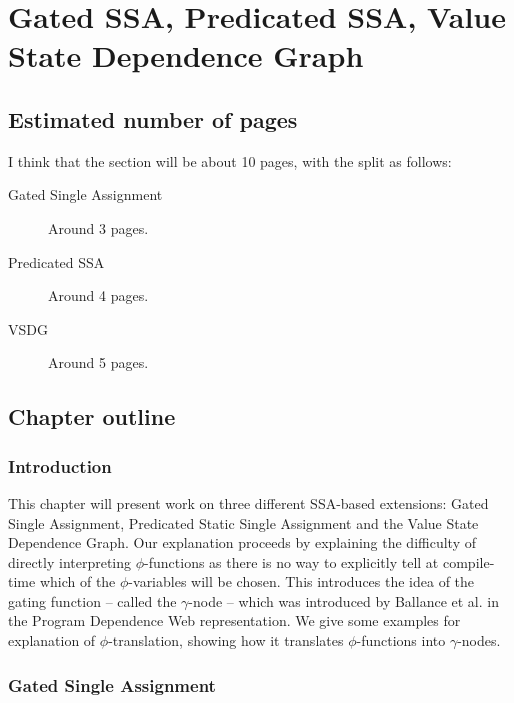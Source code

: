 \applynumberofpages\chapter{Gated SSA, Predicated SSA, Value State Dependence Graph }



\section*{Estimated number of pages}

I think that the section will be about 10 pages, with the split as follows:

\begin{description}
\item[Gated Single Assignment] Around 3 pages.
\item[Predicated SSA] Around 4 pages.
\item[VSDG] Around 5 pages.
\end{description}

\section*{Chapter outline}

\subsection*{Introduction}

This chapter will present work on three different SSA-based extensions: Gated Single Assignment, Predicated Static Single Assignment and the Value State Dependence Graph. Our explanation proceeds by explaining the difficulty of directly interpreting $\phi$-functions as there is no way to explicitly tell at compile-time which of the $\phi$-variables will be chosen. This introduces the idea of the gating function -- called the $\gamma$-node -- which was introduced by Ballance et al. in the Program Dependence Web\cite{207115} representation. We give some examples for explanation of $\phi$-translation, showing how it translates $\phi$-functions into $\gamma$-nodes.

\subsection*{Gated Single Assignment}

